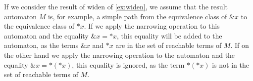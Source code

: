 \begin{example}
    If we consider the result of widen of \cref{ex:widen}, we assume that the result automaton $M$
    is, for example, a simple path from the equivalence class of $\&x$ to the equivalence class of $*x$.
    If we apply the narrowing operation to this automaton and the equality $\&x = *x$, this equality will
    be added to the automaton, as the terms $\&x$ and $*x$ are in the set of reachable terms of $M$.
    If on the other hand we apply the narrowing operation to the automaton and the equality $\&x = *(*x)$,
    this equality is ignored, as the term $*(*x)$ is not in the set of reachable terms of $M$.
\end{example}
